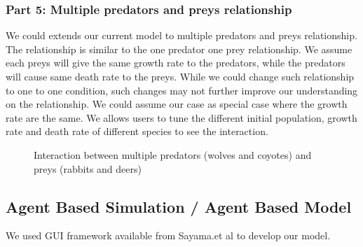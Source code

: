 \documentclass{article}
\begin{document}
\begin{normalsize}
	\subsubsection{Part 5: Multiple predators and preys relationship}
	We could extends our current model to multiple predators and preys relationship. The relationship is similar to the one predator one prey relationship. We assume each preys will give the same growth rate to the predators, while the predators will cause same death rate to the preys. While we could change such relationship to one to one condition, such changes may not further improve our understanding on the relationship. We could assume our case as special case where the growth rate are the same.
		We allows users to tune the different initial population, growth rate and death rate of different species to see the interaction. 
	\begin{figure}[H]
		\caption{Interaction between multiple predators (wolves and coyotes) and preys (rabbits and deers)}
	\end{figure}

\subsection{Agent Based Simulation / Agent Based Model}
We used GUI framework available from Sayama.et al \cite{Sayama2013} to develop our model.

\end{normalsize}
\end{document}
